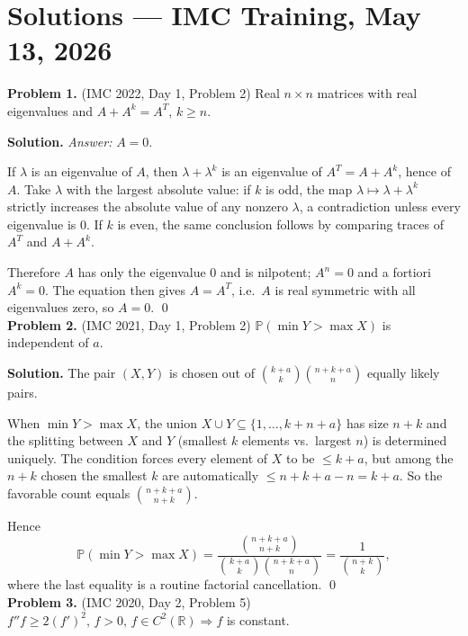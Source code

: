\documentclass{article}
\newcommand{\R}{\mathbb{R}}
\begin{document}
\pagestyle{plain}

\section*{Solutions --- IMC Training, May 13, 2026}

\textbf{Problem 1.} (IMC 2022, Day 1, Problem 2)
Real \( n \times n \) matrices with real eigenvalues and \( A + A^k = A^T \), \( k \geq n \).

\textbf{Solution.} \textit{Answer:} \( A = 0 \).

If \( \lambda \) is an eigenvalue of \( A \), then \( \lambda + \lambda^k \) is an eigenvalue of \( A^T = A + A^k \), hence of \( A \). Take \( \lambda \) with the largest absolute value: if \( k \) is odd, the map \( \lambda \mapsto \lambda + \lambda^k \) strictly increases the absolute value of any nonzero \( \lambda \), a contradiction unless every eigenvalue is \( 0 \). If \( k \) is even, the same conclusion follows by comparing traces of \( A^T \) and \( A + A^k \).

Therefore \( A \) has only the eigenvalue \( 0 \) and is nilpotent; \( A^n = 0 \) and a fortiori \( A^k = 0 \). The equation then gives \( A = A^T \), i.e.\ \( A \) is real symmetric with all eigenvalues zero, so \( A = 0 \). \qed
\\

\textbf{Problem 2.} (IMC 2021, Day 1, Problem 2)
\( \mathbb{P}(\min Y > \max X) \) is independent of \( a \).

\textbf{Solution.} The pair \( (X, Y) \) is chosen out of \( \binom{k+a}{k} \binom{n+k+a}{n} \) equally likely pairs.

When \( \min Y > \max X \), the union \( X \cup Y \subseteq \{1, \ldots, k+n+a\} \) has size \( n + k \) and the splitting between \( X \) and \( Y \) (smallest \( k \) elements vs.\ largest \( n \)) is determined uniquely. The condition forces every element of \( X \) to be \( \leq k + a \), but among the \( n + k \) chosen the smallest \( k \) are automatically \( \leq n + k + a - n = k + a \). So the favorable count equals \( \binom{n+k+a}{n+k} \).

Hence
\[
\mathbb{P}(\min Y > \max X)
= \frac{\binom{n+k+a}{n+k}}{\binom{k+a}{k}\binom{n+k+a}{n}}
= \frac{1}{\binom{n+k}{k}},
\]
where the last equality is a routine factorial cancellation. \qed
\\

\textbf{Problem 3.} (IMC 2020, Day 2, Problem 5)
\( f''f \geq 2(f')^2,\, f > 0,\, f \in C^2(\R) \Rightarrow f \) is constant.
\end{document}
